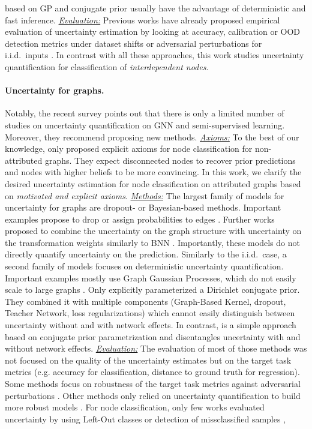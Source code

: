 based on GP and conjugate prior usually have the advantage of deterministic and fast inference. \emph{\underline{Evaluation:}} Previous works have already proposed empirical evaluation of uncertainty estimation by looking at accuracy, calibration or OOD detection metrics under dataset shifts or adversarial perturbations for i.i.d.\ inputs \citep{dataset-shift, robustness-uncertainty-dirichlet}. In contrast with all these approaches, this work studies uncertainty quantification for classification of \emph{interdependent nodes}.

\paragraph{Uncertainty for graphs.} Notably, the recent survey \citep{review-uncertainty-dl} points out that there is only a limited number of studies on uncertainty quantification on GNN and semi-supervised learning. Moreover, they recommend proposing new methods. \emph{\underline{Axioms:}} To the best of our knowledge, only \citep{Eswaran2017} proposed explicit axioms for node classification for non-attributed graphs. They expect disconnected nodes to recover prior predictions and nodes with higher beliefs to be more convincing. In this work, we clarify the desired uncertainty estimation for node classification on attributed graphs based on \emph{motivated and explicit axioms}. \emph{\underline{Methods:}} The largest family of models for uncertainty for graphs are dropout- or Bayesian-based methods. Important examples propose to drop or assign probabilities to edges \citep{Rong2019, Chen2018, Hasanzadeh2020, Dallachiesa2014, Hu2017}. Further works proposed to combine the uncertainty on the graph structure with uncertainty on the transformation weights similarly to BNN \citep{Elinas2019, Zhang2019b, Pal2019a, Pal2019b}. Importantly, these models do not directly quantify uncertainty on the prediction. Similarly to the i.i.d.\ case, a second family of models focuses on deterministic uncertainty quantification. Important examples mostly use Graph Gaussian Processes, which do not easily scale to large graphs \citep{Ng2018, Zhi2020, Liu2020c, Borovitskiy2020}. Only \citep{Zhao2020} explicitly parameterized a Dirichlet conjugate prior. They combined it with multiple components (Graph-Based Kernel, dropout, Teacher Network, loss regularizations) which cannot easily distinguish between uncertainty without and with network effects. In contrast, \GPNacro{} is a simple approach based on conjugate prior parametrization and disentangles uncertainty with and without network effects. \emph{\underline{Evaluation:}} The evaluation of most of those methods was not focused on the quality of the uncertainty estimates but on the target task metrics (e.g. accuracy for classification, distance to ground truth for regression). Some methods focus on robustness of the target task metrics against adversarial perturbations \citep{GNNBook-ch8-gunnemann, zugner2018adversarial, zugner2019adversarial}. Other methods only relied on uncertainty quantification to build more robust models \citep{Zhu2019, Feng2020}. For node classification, only few works evaluated uncertainty by using Left-Out classes or detection of missclassified samples \citep{Zhao2020}, 